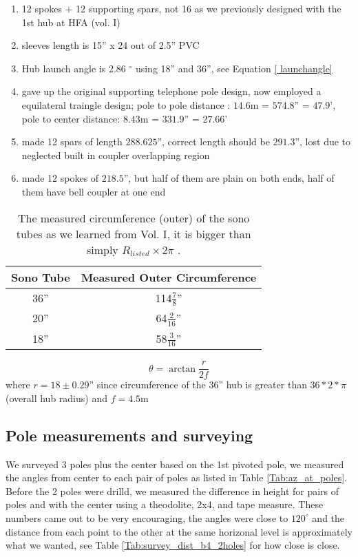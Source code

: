 \documentclass[12pt, letter]{article}
\begin{document}
\begin{enumerate}
    \item{12 spokes + 12 supporting spars, not 16 as we previously designed with the 1st hub at HFA (vol. I)}
    \item{sleeves length is 15'' x 24 out of 2.5'' PVC}
    \item{Hub launch angle is 2.86 $^{\circ}$ using 18'' and 36'', see Equation \ref{
launchangle}}
    \item{gave up the original supporting telephone pole design, now employed a
    equilateral traingle design; pole to pole distance : $14.6$m = $574.8$'' = $47.9$',
    pole to center distance: $8.43$m = $331.9$'' =  $27.66$'}
    \item{made 12 spars of length $288.625$'', correct length should be $291.3$'',
    lost due to neglected built in coupler overlapping region}
    \item{made 12 spokes of $218.5$'', but half of them are plain on both
      ends, half of them have bell coupler at one end}
\end{enumerate}

\begin{table}[!h]
  \centering
  \begin{tabular}{|c|c|} \hline
    
    Sono Tube & Measured Outer Circumference \\ \hline
    36'' & 114$\frac{7}{8}$''  \\ \hline
    20'' & 64$\frac{2}{16}$'' \\ \hline
    18'' & 58$\frac{3}{16}$'' \\ \hline
  \end{tabular}
  \caption{The measured circumference (outer) of the sono tubes as we learned from Vol. I, it is bigger than simply $R_{listed} \times 2\pi$ \label{Tab:circum_sono}.}
\end{table}

\begin{equation}
\theta = \arctan{\frac{r}{2f}} 
\label{launchangle}
\end{equation}
where $r = 18 \pm 0.29$'' since circumference of the $36$'' hub is greater than $36 * 2 *\pi$(overall hub radius) and $f = 4.5$m


\subsection{Pole measurements and surveying}
We surveyed $3$ poles plus the center based on the 1st pivoted pole, we measured the angles from center to each pair of poles as listed in Table \ref{Tab:az_at_poles}. Before the 2 poles were drilld, we measured the difference in height for pairs of poles and with the center using a theodolite, 2x4, and tape measure. These numbers came out to be very encouraging, the angles were close to $120^\circ$ and the distance from each point to the other at the same horizonal level is approximately what we wanted, see Table \ref{Tab:survey_dist_b4_2holes} for how close is close.\\
\end{document}
